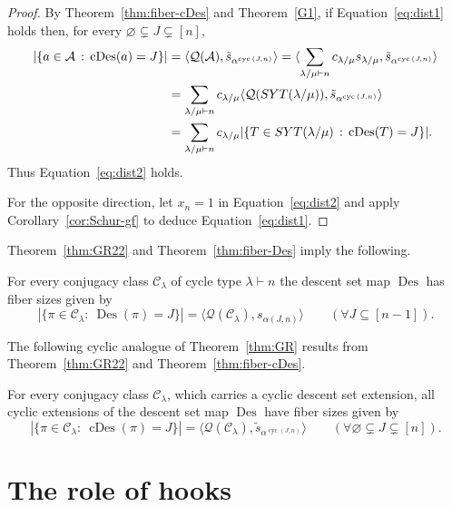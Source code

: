 \documentclass[ALCO,published]{cedram}
\newcommand{\Q}{\mathcal Q}
\newcommand{\C}{\mathcal C}
\newcommand{\A}{\mathcal A}
\DeclareMathOperator\Des{Des}
\DeclareMathOperator\cDes{cDes}
\DeclareMathOperator\cyc{cyc}
\newcommand\ccomp[2]{\alpha^{\cyc{(#2,#1)}}}
\newcommand{\cs}{\tilde s}
\def\SYT{{\rm SYT}}
\begin{document}
\begin{proof}
    By Theorem~\ref{thm:fiber-cDes} and Theorem~\ref{G1},
    if Equation~\eqref{eq:dist1} holds then,
    for every $\varnothing \subsetneq J \subsetneq [n]$,
    \begin{align*}
        |\{a \in \A \,:\, \cDes(a) = J\}| 
        &= \langle \Q(\A), \cs_{\ccomp{n}{J}} \rangle
        = \langle \sum\limits_{\lambda/\mu\vdash n} c_{\lambda/\mu} s_{\lambda/\mu}, \cs_{\ccomp{n}{J}} \rangle \\
        &= \sum\limits_{\lambda/\mu\vdash n} c_{\lambda/\mu} \langle \Q(\SYT(\lambda/\mu)), \cs_{\ccomp{n}{J}} \rangle \\
        &= \sum\limits_{\lambda/\mu\vdash n} c_{\lambda/\mu} |\{T \in \SYT(\lambda/\mu) \,:\, \cDes(T) =J\}|.
    \end{align*}
    Thus Equation~\eqref{eq:dist2} holds.

    For the opposite direction, let $x_n=1$ in Equation~\eqref{eq:dist2} and apply Corollary~\ref{cor:Schur-gf} to deduce  Equation~\eqref{eq:dist1}.
\end{proof}

Theorem~\ref{thm:GR22} and Theorem~\ref{thm:fiber-Des} imply the following. 

\begin{theorem}[{\cite[Theorem 2.1]{GR}}]\label{thm:GR}
    For every 
    conjugacy class $\C_\lambda$ of cycle type $\lambda \vdash n$ the
    descent set map $\Des$
    has fiber sizes given by
    \[
        |\{\pi \in \C_\lambda :\ 
        \Des(\pi)=J\}| = \langle \Q(\C_\lambda),  s_{\alpha(J,n)}\rangle
        \qquad (\forall J\subseteq [n-1]).
    \]
\end{theorem}

The following cyclic analogue of Theorem~\ref{thm:GR} results from Theorem~\ref{thm:GR22} and Theorem~\ref{thm:fiber-cDes}.
	
\begin{theorem}\label{thm:main22}
	For every conjugacy class $\C_\lambda$, which carries a cyclic descent set extension,
	all cyclic extensions of the descent set map $\Des$ 
	have fiber sizes given by
	\[
		|\{\pi\in \C_\lambda :\ \cDes(\pi)=J\}|=\langle \Q(\C_\lambda), \cs_{\ccomp{n}{J}} \rangle \qquad (\forall \varnothing \subsetneq J\subsetneq [n]).
	\]
\end{theorem}

		
\section{The role of hooks}\label{sec:hooks}
\end{document}
